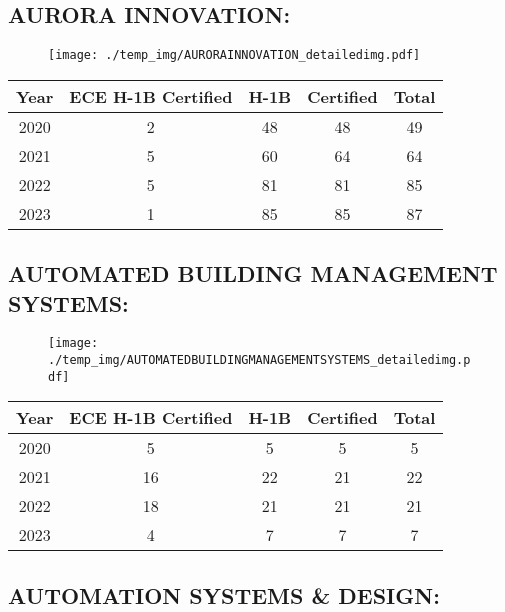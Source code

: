 \documentclass{article}%
\begin{document}
%
\newpage%
\subsection{AURORA INNOVATION:}%
\label{subsec:AURORAINNOVATION}%
\label{AURORAINNOVATIONdetailed}%


\begin{figure}[htbp]%
\centering%
\texttt{[image: ./temp\_img/AURORAINNOVATION\_detailedimg.pdf]}%
\end{figure}

%
\begin{longtable}{c|c|c|c|c}%
\hline%
Year&ECE H{-}1B Certified&H{-}1B&Certified&Total\\%
\hline%
2020&2&48&48&49\\%
\hline%
2021&5&60&64&64\\%
\hline%
2022&5&81&81&85\\%
\hline%
2023&1&85&85&87\\%
\hline%
\end{longtable}

%
\newpage%
\subsection{AUTOMATED BUILDING MANAGEMENT SYSTEMS:}%
\label{subsec:AUTOMATEDBUILDINGMANAGEMENTSYSTEMS}%
\label{AUTOMATEDBUILDINGMANAGEMENTSYSTEMSdetailed}%


\begin{figure}[htbp]%
\centering%
\texttt{[image: ./temp\_img/AUTOMATEDBUILDINGMANAGEMENTSYSTEMS\_detailedimg.pdf]}%
\end{figure}

%
\begin{longtable}{c|c|c|c|c}%
\hline%
Year&ECE H{-}1B Certified&H{-}1B&Certified&Total\\%
\hline%
2020&5&5&5&5\\%
\hline%
2021&16&22&21&22\\%
\hline%
2022&18&21&21&21\\%
\hline%
2023&4&7&7&7\\%
\hline%
\end{longtable}

%
\newpage%
\subsection{AUTOMATION SYSTEMS \& DESIGN:}%
\label{subsec:AUTOMATIONSYSTEMSDESIGN}%
\label{AUTOMATIONSYSTEMSDESIGNdetailed}%
\end{document}
